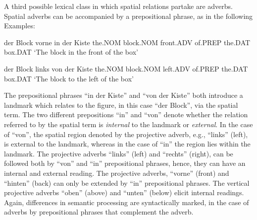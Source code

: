 A third possible lexical class in which spatial relations partake are adverbs. 
Spatial adverbs can be accompanied
by a prepositional phrase, as in the following Examples:
\begin{example}
\label{e:der-block-vorne-in-der-kiste}
\gll der Block vorne in der Kiste 
the.NOM block.NOM front.ADV of.PREP the.DAT box.DAT 
\glt `The block in the front of the box'
\glend
\end{example}
\begin{example}
\label{e:der-block-links-von-der-kiste}
\gll der Block links von der Kiste
the.NOM block.NOM left.ADV of.PREP the.DAT box.DAT 
\glt `The block to the left of the box'
\glend
\end{example}
The prepositional phrases ``in der Kiste'' and ``von der Kiste''  both introduce
a landmark which relates to the figure, in this case ``der Block'', via
the spatial term. The two different prepositions ``in'' and ``von''
denote whether the relation referred to by the spatial term is \emph{internal} 
to the landmark or \emph{external}. In the case of ``von'', the spatial
region denoted by the projective adverb, e.g., ``links'' (left), is external to the 
landmark, whereas in the case of ``in'' the region lies within the landmark. 
The projective 
adverbs ``links'' (left) and ``rechts'' (right), can be followed both by 
``von'' and ``in'' prepositional phrases, hence, they can have an internal
and external reading. The projective adverbs, ``vorne'' (front) 
and ``hinten'' (back) can only be extended by ``in'' prepositional phrases. 
The vertical projective adverbs ``oben'' (above) and ``unten'' (below)
elicit internal readings. Again, differences in semantic processing are 
syntactically marked, in the case of adverbs by prepositional phrases
that complement the adverb.


